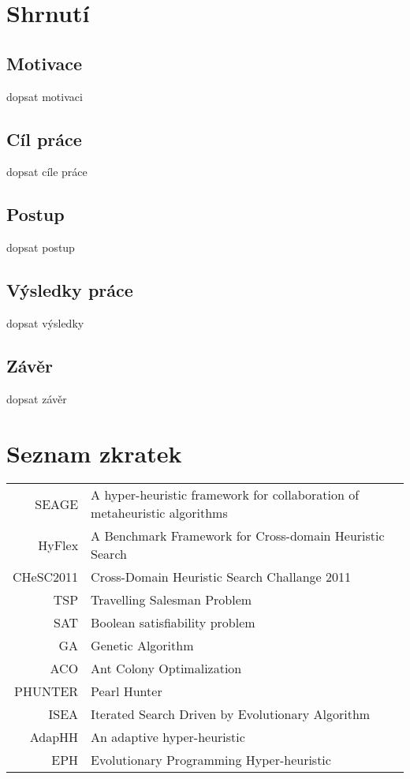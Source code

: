 \documentclass[a4paper,czech,unicode,twoside]{book}[2019/12/20]
\theoremstyle{plain}
\theoremstyle{definition}
\theoremstyle{remark}
\numberwithin{theorem}{chapter}
\begin{document}
\chapter{Shrnutí}
\setlength{\columnsep}{1cm}
\begin{multicols}{2}
{\small

\section*{Motivace}

dopsat motivaci

\section*{Cíl práce}

dopsat cíle práce

\section*{Postup}

dopsat postup

\section*{Výsledky práce}

dopsat výsledky

\section*{Závěr}

dopsat závěr
}
\end{multicols}

\chapter{Seznam zkratek}
	
\begin{tabular}{rl}
SEAGE & A hyper-heuristic framework for collaboration of metaheuristic algorithms\\
HyFlex & A Benchmark Framework for Cross-domain Heuristic Search\\
CHeSC2011 & Cross-Domain Heuristic Search Challange 2011\\
TSP & Travelling Salesman Problem\\
SAT & Boolean satisfiability problem\\
GA & Genetic Algorithm\\
ACO & Ant Colony Optimalization\\
PHUNTER & Pearl Hunter\\
ISEA & Iterated Search Driven by Evolutionary Algorithm\\
AdapHH & An adaptive hyper-heuristic\\
EPH & Evolutionary Programming Hyper-heuristic\\ 
\end{tabular}
\end{document}
